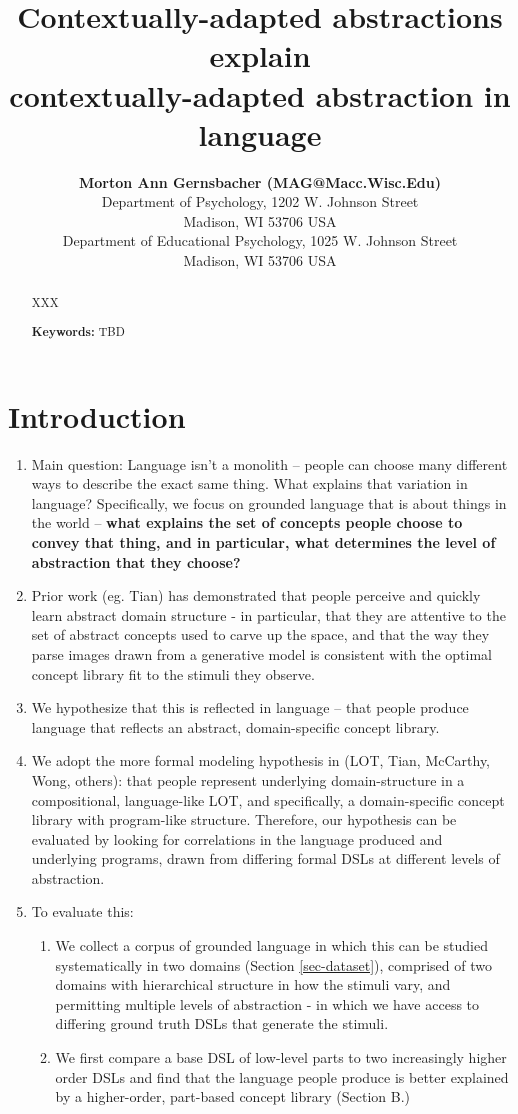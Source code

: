 \documentclass[10pt,letterpaper]{article}
\title{Contextually-adapted abstractions explain \\ contextually-adapted abstraction in language}
\author{{\large \bf Morton Ann Gernsbacher (MAG@Macc.Wisc.Edu)} \\
  Department of Psychology, 1202 W. Johnson Street \\
  Madison, WI 53706 USA
  \AND {\large \bf Sharon J.~Derry (SDJ@Macc.Wisc.Edu)} \\
  Department of Educational Psychology, 1025 W. Johnson Street \\
  Madison, WI 53706 USA}
\begin{document}
\maketitle


\begin{abstract}
XXX

\textbf{Keywords:} TBD
\end{abstract}


\section{Introduction} \label{sec-introduction}
\begin{enumerate}
    \item Main question: Language isn’t a monolith -- people can choose many different ways to describe the exact  same thing. What explains that variation in language? Specifically, we focus on grounded language that is about things in the world -- \textbf{what explains the set of concepts people choose to convey that thing, and in particular, what determines the level of abstraction that they choose?}
    \item Prior work (eg. Tian) has demonstrated that people perceive and quickly learn abstract domain structure - in particular, that they are attentive to the set of abstract concepts used to carve up the space, and that the way they parse images drawn from a generative model is consistent with the optimal concept library fit to the stimuli they observe.
    \item We hypothesize that this is reflected in language -- that people produce language that reflects an abstract, domain-specific concept library. 
    \item We adopt the more formal modeling hypothesis in (LOT, Tian, McCarthy, Wong, others): that people represent underlying domain-structure in a compositional, language-like LOT, and specifically, a domain-specific concept library with program-like structure. Therefore, our hypothesis can be evaluated by looking for correlations in the language produced and underlying programs, drawn from differing formal DSLs at different levels of abstraction.
    \item To evaluate this:
        \begin{enumerate}
            \item We collect a corpus of grounded language in which this can be studied systematically in two domains (Section \ref{sec-dataset}), comprised of two domains with hierarchical structure in how the stimuli vary, and permitting multiple levels of abstraction - in which we have access to differing ground truth DSLs that generate the stimuli.
            \item We first compare a base DSL of low-level parts to two increasingly higher order DSLs and find that the language people produce is better explained by a higher-order, part-based concept library (Section B.)

        \end{enumerate}
\end{enumerate}
\end{document}
